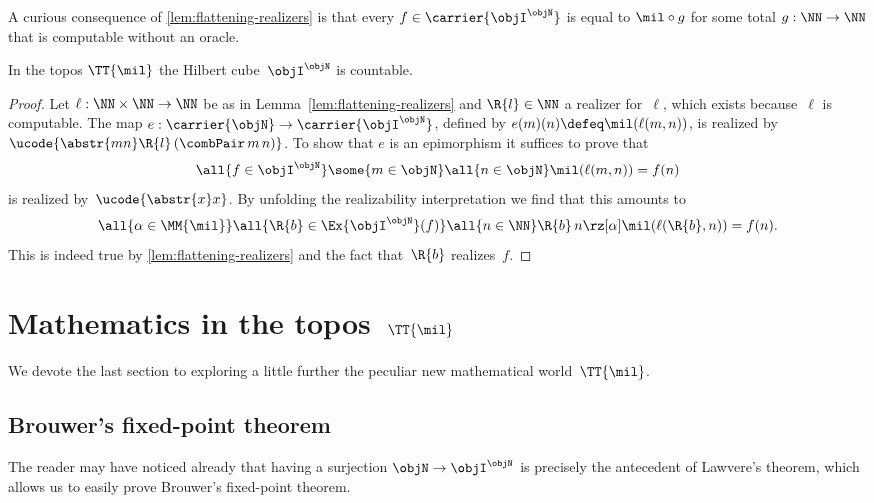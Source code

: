 A curious consequence of \cref{lem:flattening-realizers} is that every $f \in \carrier{\objI^\objN}$ is equal to $\mil\circ g$ for some total $g : \NN \to \NN$ that is computable without an oracle.

\begin{theorem}
  \label{thm:hilbert-countable}%
  In the topos $\TT{\mil}$ the Hilbert cube~$\objI^\objN$ is countable.
\end{theorem}

\begin{proof}
  Let $\ell : \NN \times \NN \to \NN$ be as in Lemma~\ref{lem:flattening-realizers} and
  $\R{l} \in \NN$ a realizer for~$\ell$, which exists because~$\ell$ is computable.
  The map $e : \carrier{\objN} \to \carrier{\objI^\objN}$, defined by $e(m)(n) \defeq \mil(\ell(m,n))$, is realized by
  $\ucode{\abstr{m n} \R{l} \, (\combPair \, m \, n)}$.
  To show that $e$ is an epimorphism it suffices to prove that
  \begin{equation*}
    \all{f \in \objI^\objN}
    \some{m \in \objN}
    \all{n \in \objN}
    \mil(\ell(m,n)) = f(n)
  \end{equation*}
  is realized by~$\ucode{\abstr{x} x}$.
  By unfolding the realizability interpretation we find that this amounts to
  \begin{equation*}
    \all{\alpha \in \MM{\mil}}
    \all{\R{b} \in \Ex{\objI^\objN}(f)}
    \all{n \in \NN}
    \R{b} \, n \rz[\alpha] \mil(\ell(\R{b},n)) = f(n).
  \end{equation*}
  This is indeed true by \cref{lem:flattening-realizers} and the fact that~$\R{b}$ realizes~$f$.
\end{proof}

\section{\texorpdfstring{Mathematics in the topos~$\TT{\mil}$}{Mathematics in the topos Tμ}}
\label{sec:analysis-topos-tt}

We devote the last section to exploring a little further the peculiar new mathematical world~$\TT{\mil}$.

\subsection{Brouwer's fixed-point theorem}
\label{sec:brouwers-fixed-point}
%
The reader may have noticed already that having a surjection $\objN \to \objI^\objN$ is precisely the antecedent of Lawvere's theorem, which allows us to easily prove Brouwer's fixed-point theorem.

